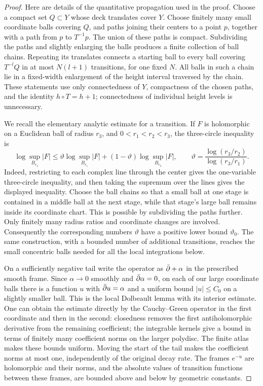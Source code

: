\begin{proof}
Here are details of the quantitative propagation used in the proof.
Choose a compact set $Q\subset Y$ whose deck translates cover $Y$.
Choose finitely many small coordinate balls covering $Q$, and paths
joining their centers to a point $p$, together with a path from $p$ to
$T^{-1}p$.  The union of these paths is compact.  Subdividing the paths
and slightly enlarging the balls produces a finite collection of ball
chains.  Repeating its translates connects a starting ball to every
ball covering $T^{-l}Q$ in at most $N(l+1)$ transitions, for one fixed
$N$.  All balls in such a chain lie in a fixed-width enlargement of the
height interval traversed by the chain.  These statements use only
connectedness of $Y$, compactness of the chosen paths, and the identity
$h\circ T=h+1$; connectedness of individual height levels is unnecessary.

We recall the elementary analytic estimate for a transition.  If $F$ is
holomorphic on a Euclidean ball of radius $r_3$, and
$0<r_1<r_2<r_3$, the three-circle inequality is
\begin{equation}\label{curve:three-ball}
 \log\sup_{B_{r_2}}|F|
 \le \vartheta\log\sup_{B_{r_1}}|F|
       +(1-\vartheta)\log\sup_{B_{r_3}}|F|,
 \qquad
 \vartheta=\frac{\log(r_3/r_2)}{\log(r_3/r_1)}.
\end{equation}
Indeed, restricting to each complex line through the center gives the
one-variable three-circle inequality, and then taking the supremum over
the lines gives the displayed inequality.  Choose the ball chains so
that a small ball at one stage is contained in a middle ball at the next
stage, while that stage's large ball remains inside its coordinate
chart.  This is possible by subdividing the paths further.  Only
finitely many radius ratios and coordinate changes are involved.
Consequently the corresponding numbers $\vartheta$ have a positive
lower bound $\vartheta_0$.  The same construction, with a bounded number
of additional transitions, reaches the small concentric balls needed
for all the local integrations below.

On a sufficiently negative tail write the operator as $\bar\partial+\alpha$
in the prescribed smooth frame.  Since $\alpha\to0$ smoothly and
$\bar\partial\alpha=0$, on each of our large coordinate balls there is a
function $u$ with $\bar\partial u=\alpha$ and a uniform bound $|u|\le C_0$ on
a slightly smaller ball.  This is the local Dolbeault lemma with its
interior estimate.  One can obtain the estimate directly by the
Cauchy--Green operator in the first coordinate and then in the second:
closedness removes the first antiholomorphic derivative from the
remaining coefficient; the integrable kernels give a bound in terms
of finitely many coefficient norms on the larger polydisc.  The finite
atlas makes these bounds uniform.  Moving the start of the tail makes
the coefficient norms at most one, independently of the original
decay rate.  The frames $e^{-u}$ are holomorphic and their norms, and
the absolute values of transition functions between these frames,
are bounded above and below by geometric constants.


\end{proof}
